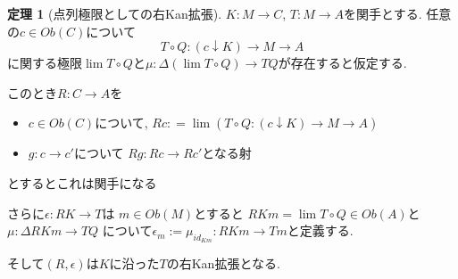 \documentclass[dvipdfmx,a4paper,11pt]{article}
\theoremstyle{definition}
\newtheorem{thm}{定理}
\begin{document}
 \begin{tcolorbox}
 [colback = white, colframe = green!35!black, fonttitle = \bfseries,breakable = true]
\begin{thm}[点列極限としての右Kan拡張]
\label{thm-Kan-extension}
$K : M \to C$, $T : M \to A$を関手とする.
任意の$c \in Ob(C)$について
$$
T \circ Q : (c \downarrow K) \to M \to A
$$
に関する極限$\lim T\circ Q$と$\mu: \Delta (\lim T\circ Q) \to TQ$が存在すると仮定する.

このとき$R : C \to A$を
\begin{itemize}
\item $c \in Ob(C)$について, $Rc : = \lim (T \circ Q : (c \downarrow K) \to M \to A)$
\item $g : c \to c'$について $Rg : Rc \to Rc'$となる射
\end{itemize}
とするとこれは関手になる

さらに$\epsilon : RK \to T$は
$m \in Ob(M)$とすると
$RKm =\lim T\circ Q \in Ob(A)$と$\mu: \Delta RKm \to TQ$
について$\epsilon_{m} := \mu_{ id_{Km}} : RKm \to Tm$と定義する.




そして$(R,\epsilon)$は$K$に沿った$T$の右Kan拡張となる. 

\end{thm}
\end{tcolorbox}
\end{document}
